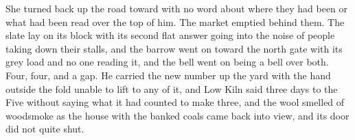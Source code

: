 She turned back up the road toward  with no word about where they had been or what had been read over the top of him. The market emptied behind them. The slate lay on its block with its second flat answer going into the noise of people taking down their stalls, and the barrow went on toward the north gate with its grey load and no one reading it, and the bell went on being a bell over both. Four, four, and a gap. He carried the new number up the yard with the hand outside the fold unable to lift to any of it, and Low Kiln said three days to the Five without saying what it had counted to make three, and the wool smelled of woodsmoke as the house with the banked coals came back into view, and its door did not quite shut.
